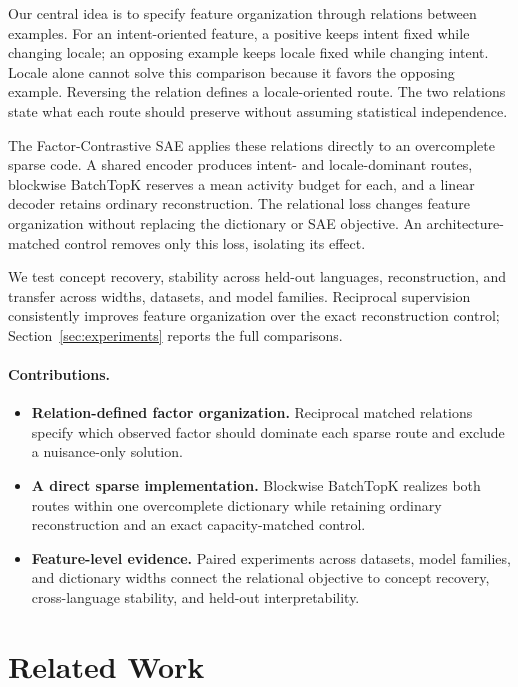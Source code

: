 \documentclass[11pt]{article}
\newcommand{\method}{Factor-Contrastive SAE}
\begin{document}
Our central idea is to specify feature organization through relations between examples. For an intent-oriented feature, a positive keeps intent fixed while changing locale; an opposing example keeps locale fixed while changing intent. Locale alone cannot solve this comparison because it favors the opposing example. Reversing the relation defines a locale-oriented route. The two relations state what each route should preserve without assuming statistical independence.

The \method{} applies these relations directly to an overcomplete sparse code. A shared encoder produces intent- and locale-dominant routes, blockwise BatchTopK \citep{bussmann2024batchtopk} reserves a mean activity budget for each, and a linear decoder retains ordinary reconstruction. The relational loss changes feature organization without replacing the dictionary or SAE objective. An architecture-matched control removes only this loss, isolating its effect.

We test concept recovery, stability across held-out languages, reconstruction, and transfer across widths, datasets, and model families. Reciprocal supervision consistently improves feature organization over the exact reconstruction control; Section~\ref{sec:experiments} reports the full comparisons.

\paragraph{Contributions.}
\begin{itemize}
    \item \textbf{Relation-defined factor organization.} Reciprocal matched relations specify which observed factor should dominate each sparse route and exclude a nuisance-only solution.
    \item \textbf{A direct sparse implementation.} Blockwise BatchTopK realizes both routes within one overcomplete dictionary while retaining ordinary reconstruction and an exact capacity-matched control.
    \item \textbf{Feature-level evidence.} Paired experiments across datasets, model families, and dictionary widths connect the relational objective to concept recovery, cross-language stability, and held-out interpretability.
\end{itemize}

\section{Related Work}
\end{document}
